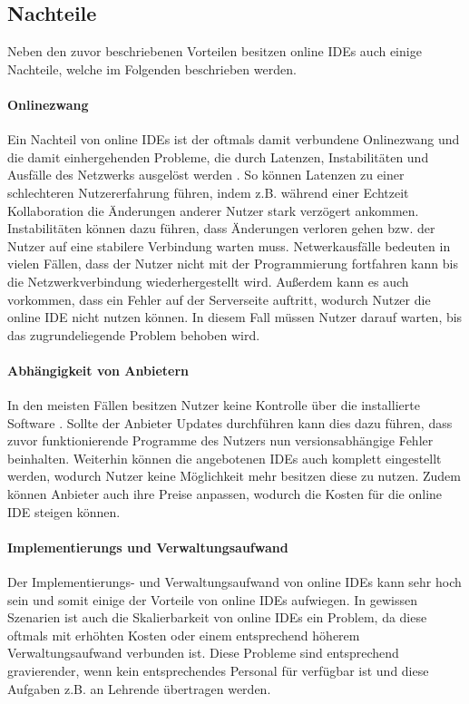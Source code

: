 \subsection{Nachteile}\label{section:stand-der-technik:literaturrecherche:nachteile}

Neben den zuvor beschriebenen Vorteilen besitzen online IDEs auch einige Nachteile, welche im Folgenden beschrieben werden.

\paragraph{Onlinezwang}
Ein Nachteil von online IDEs ist der oftmals damit verbundene Onlinezwang und die damit einhergehenden Probleme, die durch Latenzen, Instabilitäten und Ausfälle des Netzwerks ausgelöst werden \cite{kats_software_2012}\cite{leisner_good-bye_2019}. So können Latenzen zu einer schlechteren Nutzererfahrung führen, indem z.B. während einer Echtzeit Kollaboration die Änderungen anderer Nutzer stark verzögert ankommen. Instabilitäten können dazu führen, dass Änderungen verloren gehen bzw. der Nutzer auf eine stabilere Verbindung warten muss. Netwerkausfälle bedeuten in vielen Fällen, dass der Nutzer nicht mit der Programmierung fortfahren kann bis die Netzwerkverbindung wiederhergestellt wird. Außerdem kann es auch vorkommen, dass ein Fehler auf der Serverseite auftritt, wodurch Nutzer die online IDE nicht nutzen können. In diesem Fall müssen Nutzer darauf warten, bis das zugrundeliegende Problem behoben wird.

\paragraph{Abhängigkeit von Anbietern}
In den meisten Fällen besitzen Nutzer keine Kontrolle über die installierte Software \cite{kats_software_2012}. Sollte der Anbieter Updates durchführen kann dies dazu führen, dass zuvor funktionierende Programme des Nutzers nun versionsabhängige Fehler beinhalten. Weiterhin können die angebotenen IDEs auch komplett eingestellt werden, wodurch Nutzer keine Möglichkeit mehr besitzen diese zu nutzen. Zudem können Anbieter auch ihre Preise anpassen, wodurch die Kosten für die online IDE steigen können.

\paragraph{Implementierungs und Verwaltungsaufwand}
Der Implementierungs- und Verwaltungsaufwand von online IDEs kann sehr hoch sein \cite{malan_standardizing_2022} und somit einige der Vorteile von online IDEs aufwiegen. In gewissen Szenarien ist auch die Skalierbarkeit von online IDEs ein Problem, da diese oftmals mit erhöhten Kosten oder einem entsprechend höherem Verwaltungsaufwand verbunden ist. Diese Probleme sind entsprechend gravierender, wenn kein entsprechendes Personal für verfügbar ist und diese Aufgaben z.B. an Lehrende übertragen werden.

